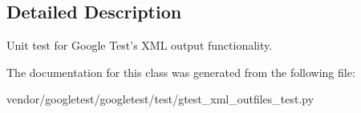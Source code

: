 \subsection{Detailed Description}
\begin{DoxyVerb}Unit test for Google Test's XML output functionality.\end{DoxyVerb}
 

The documentation for this class was generated from the following file\+:\begin{DoxyCompactItemize}
\item 
vendor/googletest/googletest/test/gtest\+\_\+xml\+\_\+outfiles\+\_\+test.\+py\end{DoxyCompactItemize}
